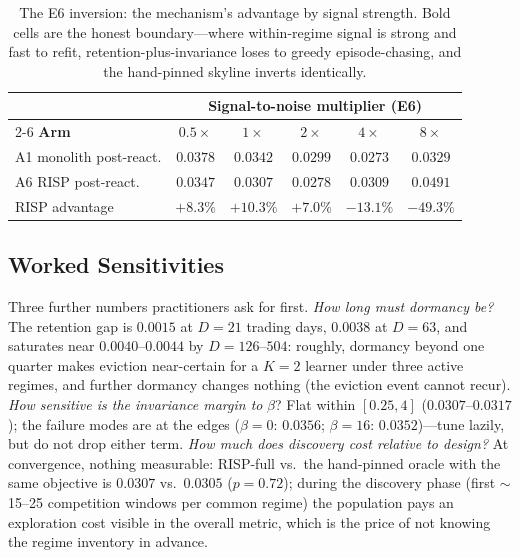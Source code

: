 \documentclass[10pt]{article}
\newcommand{\nm}{\textsc{RISP}}
\begin{document}
\begin{table}[h]
\centering
\small
\begin{tabular}{lccccc}
\toprule
& \multicolumn{5}{c}{\textbf{Signal-to-noise multiplier (E6)}} \\
\cmidrule(lr){2-6}
\textbf{Arm} & $0.5\times$ & $1\times$ & $2\times$ & $4\times$ & $8\times$ \\
\midrule
A1 monolith post-react. & $0.0378$ & $0.0342$ & $0.0299$ & $0.0273$ & $0.0329$ \\
A6 \nm{} post-react.    & $0.0347$ & $0.0307$ & $0.0278$ & $0.0309$ & $0.0491$ \\
\midrule
\nm{} advantage & $+8.3\%$ & $+10.3\%$ & $+7.0\%$ & $\mathbf{-13.1\%}$ & $\mathbf{-49.3\%}$ \\
\bottomrule
\end{tabular}
\caption{The E6 inversion: the mechanism's advantage by signal strength.
Bold cells are the honest boundary---where within-regime signal is strong
and fast to refit, retention-plus-invariance loses to greedy
episode-chasing, and the hand-pinned skyline inverts identically.}
\label{tab:exp-snr}
\end{table}

\subsection{Worked Sensitivities}

Three further numbers practitioners ask for first. \emph{How long must
dormancy be?} The retention gap is $0.0015$ at $D = 21$ trading days,
$0.0038$ at $D = 63$, and saturates near $0.0040$--$0.0044$ by
$D = 126$--$504$: roughly, dormancy beyond one quarter makes eviction
near-certain for a $K = 2$ learner under three active regimes, and
further dormancy changes nothing (the eviction event cannot recur).
\emph{How sensitive is the invariance margin to} $\beta$? Flat within
$[0.25, 4]$ ($0.0307$--$0.0317$); the failure modes are at the edges
($\beta = 0$: $0.0356$; $\beta = 16$: $0.0352$)---tune lazily, but do not
drop either term. \emph{How much does discovery cost relative to
design?} At convergence, nothing measurable: \nm{}-full vs.\ the
hand-pinned oracle with the same objective is $0.0307$ vs.\ $0.0305$
($p = 0.72$); during the discovery phase (first $\sim$15--25 competition
windows per common regime) the population pays an exploration cost
visible in the overall metric, which is the price of not knowing the
regime inventory in advance.

\end{document}
